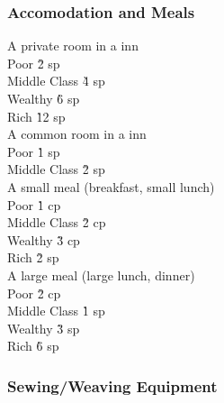 \begin{multicols}{3}
{\subsubsection{Accomodation and Meals}
\begin{tabbing}
A private room in a inn						\\
\hspace{0.4cm} Poor						\` 2 sp \\
\hspace{0.4cm} Middle Class					\` 4 sp \\
\hspace{0.4cm} Wealthy						\` 6 sp \\
\hspace{0.4cm} Rich						\` 12 sp \\
A common room in a inn							\\
\hspace{0.4cm} Poor						\` 1 sp \\
\hspace{0.4cm} Middle Class					\` 2 sp \\
A small meal (breakfast, small lunch)					\\
\hspace{0.4cm} Poor						\` 1 cp \\
\hspace{0.4cm} Middle Class					\` 2 cp \\
\hspace{0.4cm} Wealthy						\` 3 cp \\
\hspace{0.4cm} Rich						\` 2 sp \\
A large meal (large lunch, dinner)					\\
\hspace{0.4cm} Poor						\` 2 cp \\
\hspace{0.4cm} Middle Class					\` 1 sp \\
\hspace{0.4cm} Wealthy						\` 3 sp \\
\hspace{0.4cm} Rich						\` 6 sp \\
\end{tabbing}

\subsubsection{Sewing/Weaving Equipment}

}
\end{multicols}
